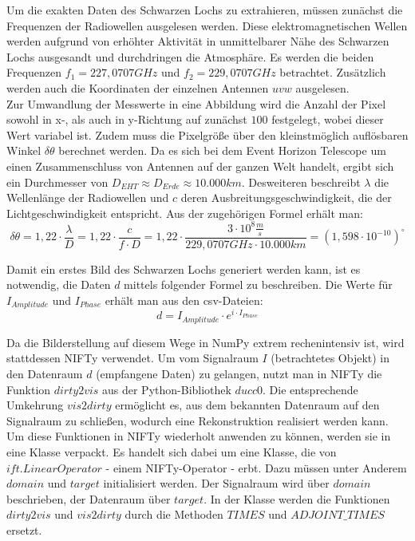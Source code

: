\documentclass[]{dsadokumentation}
\begin{document}
Um die exakten Daten des Schwarzen Lochs zu extrahieren, müssen zunächst die Frequenzen der Radiowellen ausgelesen werden. Diese elektromagnetischen Wellen werden aufgrund von erhöhter Aktivität in unmittelbarer Nähe des Schwarzen Lochs ausgesandt und durchdringen die Atmosphäre. Es werden die beiden Frequenzen $f_1 = 227,0707GHz$ und $f_2 = 229,0707GHz$ betrachtet. Zusätzlich werden auch die Koordinaten der einzelnen Antennen $uvw$ ausgelesen.\\

Zur Umwandlung der Messwerte in eine Abbildung wird die Anzahl der Pixel sowohl in x-, als auch in y-Richtung auf zunächst $100$ festgelegt, wobei dieser Wert variabel ist. Zudem muss die Pixelgröße über den kleinstmöglich auflösbaren Winkel $\delta \theta$ berechnet werden. Da es sich bei dem Event Horizon Telescope um einen Zusammenschluss von Antennen auf der ganzen Welt handelt, ergibt sich ein Durchmesser von $D_{EHT} \approx D_{Erde} \approx 10.000km$. Desweiteren beschreibt $\lambda$ die Wellenlänge der Radiowellen und $c$ deren Ausbreitungsgeschwindigkeit, die der Lichtgeschwindigkeit entspricht. Aus der zugehörigen Formel erhält man:
\[ \delta \theta = 1,22 \cdot \displaystyle\frac{\lambda}{D} = 1,22 \cdot \displaystyle\frac{c}{f \cdot D} = 1,22 \cdot \displaystyle\frac{3 \cdot 10^{8} \displaystyle\frac{m}{s}} {229,0707 GHz \cdot 10.000 km} = (1,598 \cdot 10^{-10}) ^\circ \]

Damit ein erstes Bild des Schwarzen Lochs generiert werden kann, ist es notwendig, die Daten $d$ mittels folgender Formel zu beschreiben. Die Werte für $I_{Amplitude}$ und $I_{Phase}$ erhält man aus den csv-Dateien:
\[ d = I_{Amplitude} \cdot e^{i \cdot I_{Phase}} \]

Da die Bilderstellung auf diesem Wege in NumPy extrem rechenintensiv ist, wird stattdessen NIFTy verwendet. Um vom Signalraum $I$ (betrachtetes Objekt) in den Datenraum $d$ (empfangene Daten) zu gelangen, nutzt man in NIFTy die Funktion $dirty2vis$ aus der Python-Bibliothek $ducc0$. Die entsprechende Umkehrung $vis2dirty$ ermöglicht es, aus dem bekannten Datenraum auf den Signalraum zu schließen, wodurch eine Rekonstruktion realisiert werden kann.\\
Um diese Funktionen in NIFTy wiederholt anwenden zu können, werden sie in eine Klasse verpackt. Es handelt sich dabei um eine Klasse, die von $ift.LinearOperator$ - einem NIFTy-Operator - erbt. Dazu müssen unter Anderem $domain$ und $target$ initialisiert werden. Der Signalraum wird über $domain$ beschrieben, der Datenraum über $target$. In der Klasse werden die Funktionen $dirty2vis$ und $vis2dirty$ durch die Methoden $TIMES$ und $ADJOINT \_ TIMES$ ersetzt.\\
\end{document}
